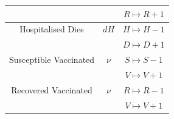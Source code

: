 \documentclass[a4paper,11pt]{article}
\theoremstyle{plain}
\theoremstyle{definition}
\begin{document}
\begin{table}[hbtp]
\begin{center}
\begin{tabular}{ c|c|c }
	             &  & $R \mapsto R + 1$\\
	            \hline
	            Hospitalised Dies & $d H$ & $H \mapsto H - 1$\\
	            &  & $D \mapsto D + 1$\\
	            \hline
	            Susceptible Vaccinated & $\nu$ &  $S \mapsto S - 1$\\
	            &  & $V \mapsto V + 1$\\
	            \hline
	            Recovered Vaccinated & $\nu$ &  $R \mapsto R - 1$\\
	            &  & $V \mapsto V + 1$\\
			\end{tabular}
			\label{tab:A}
		\end{center}
	\end{table}
	
\end{document}
